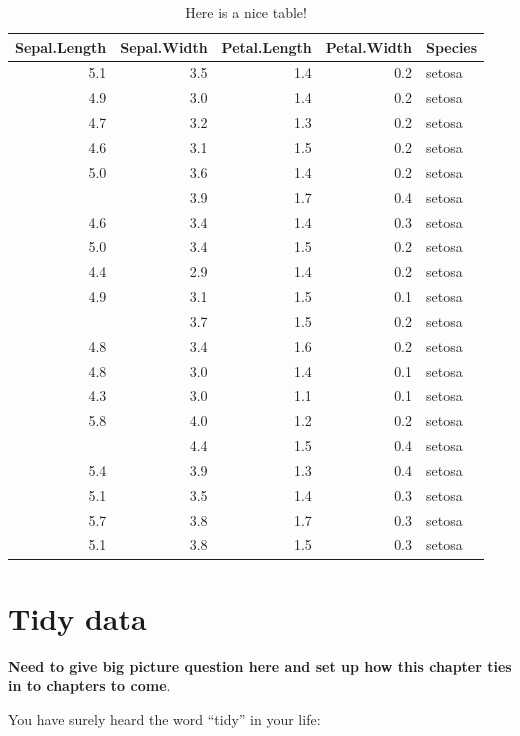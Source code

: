\documentclass[]{tufte-book}
\begin{document}
\begin{table}

\caption{\label{tab:nice-tab}Here is a nice table!}
\centering
\begin{tabular}[t]{rrrrl}
\toprule
Sepal.Length & Sepal.Width & Petal.Length & Petal.Width & Species\\
\midrule
5.1 & 3.5 & 1.4 & 0.2 & setosa\\
4.9 & 3.0 & 1.4 & 0.2 & setosa\\
4.7 & 3.2 & 1.3 & 0.2 & setosa\\
4.6 & 3.1 & 1.5 & 0.2 & setosa\\
5.0 & 3.6 & 1.4 & 0.2 & setosa\\
\addlinespace
5.4 & 3.9 & 1.7 & 0.4 & setosa\\
4.6 & 3.4 & 1.4 & 0.3 & setosa\\
5.0 & 3.4 & 1.5 & 0.2 & setosa\\
4.4 & 2.9 & 1.4 & 0.2 & setosa\\
4.9 & 3.1 & 1.5 & 0.1 & setosa\\
\addlinespace
5.4 & 3.7 & 1.5 & 0.2 & setosa\\
4.8 & 3.4 & 1.6 & 0.2 & setosa\\
4.8 & 3.0 & 1.4 & 0.1 & setosa\\
4.3 & 3.0 & 1.1 & 0.1 & setosa\\
5.8 & 4.0 & 1.2 & 0.2 & setosa\\
\addlinespace
5.7 & 4.4 & 1.5 & 0.4 & setosa\\
5.4 & 3.9 & 1.3 & 0.4 & setosa\\
5.1 & 3.5 & 1.4 & 0.3 & setosa\\
5.7 & 3.8 & 1.7 & 0.3 & setosa\\
5.1 & 3.8 & 1.5 & 0.3 & setosa\\
\bottomrule
\end{tabular}
\end{table}

\chapter{Tidy data}\label{tidy}

\textbf{Need to give big picture question here and set up how this
chapter ties in to chapters to come}.

You have surely heard the word ``tidy'' in your life:
\end{document}
